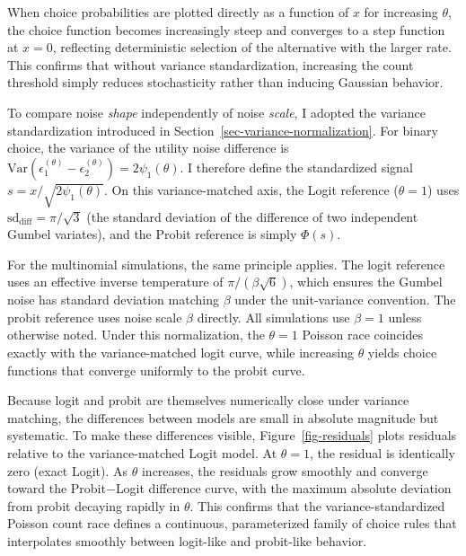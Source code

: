\documentclass[
  man,
  floatsintext,
  longtable,
  a4paper,
  nolmodern,
  notxfonts,
  notimes,
  colorlinks=true,linkcolor=blue,citecolor=blue,urlcolor=blue]{apa7}
\begin{document}
When choice probabilities are plotted directly as a function of \(x\)
for increasing \(\theta\), the choice function becomes increasingly
steep and converges to a step function at \(x = 0\), reflecting
deterministic selection of the alternative with the larger rate. This
confirms that without variance standardization, increasing the count
threshold simply reduces stochasticity rather than inducing Gaussian
behavior.

To compare noise \emph{shape} independently of noise \emph{scale}, I
adopted the variance standardization introduced in
Section~\ref{sec-variance-normalization}. For binary choice, the
variance of the utility noise difference is
\(\text{Var}(\epsilon_1^{(\theta)} - \epsilon_2^{(\theta)}) = 2\psi_1(\theta)\).
I therefore define the standardized signal
\(s = x / \sqrt{2\psi_1(\theta)}\). On this variance-matched axis, the
Logit reference (\(\theta = 1\)) uses
\(\text{sd}_{\text{diff}} = \pi/\sqrt{3}\) (the standard deviation of
the difference of two independent Gumbel variates), and the Probit
reference is simply \(\Phi(s)\).

For the multinomial simulations, the same principle applies. The logit
reference uses an effective inverse temperature of
\(\pi / (\beta\sqrt{6})\), which ensures the Gumbel noise has standard
deviation matching \(\beta\) under the unit-variance convention. The
probit reference uses noise scale \(\beta\) directly. All simulations
use \(\beta = 1\) unless otherwise noted. Under this normalization, the
\(\theta = 1\) Poisson race coincides exactly with the variance-matched
logit curve, while increasing \(\theta\) yields choice functions that
converge uniformly to the probit curve.

Because logit and probit are themselves numerically close under variance
matching, the differences between models are small in absolute magnitude
but systematic. To make these differences visible,
Figure~\ref{fig-residuals} plots residuals relative to the
variance-matched Logit model. At \(\theta = 1\), the residual is
identically zero (exact Logit). As \(\theta\) increases, the residuals
grow smoothly and converge toward the Probit\(-\)Logit difference curve,
with the maximum absolute deviation from probit decaying rapidly in
\(\theta\). This confirms that the variance-standardized Poisson count
race defines a continuous, parameterized family of choice rules that
interpolates smoothly between logit-like and probit-like behavior.
\end{document}
